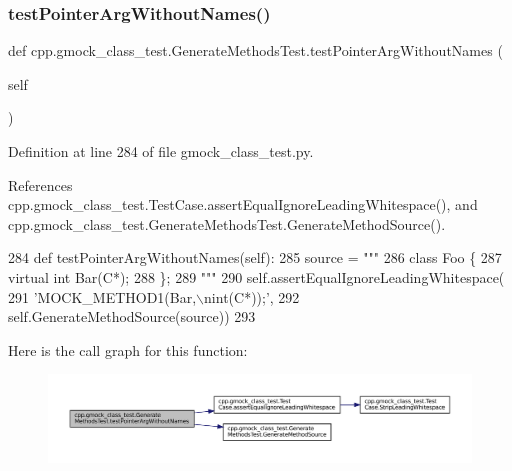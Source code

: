 \subsubsection{\texorpdfstring{test\+Pointer\+Arg\+Without\+Names()}{testPointerArgWithoutNames()}}
{\footnotesize\ttfamily def cpp.\+gmock\+\_\+class\+\_\+test.\+Generate\+Methods\+Test.\+test\+Pointer\+Arg\+Without\+Names (\begin{DoxyParamCaption}\item[{}]{self }\end{DoxyParamCaption})}



Definition at line 284 of file gmock\+\_\+class\+\_\+test.\+py.



References cpp.\+gmock\+\_\+class\+\_\+test.\+Test\+Case.\+assert\+Equal\+Ignore\+Leading\+Whitespace(), and cpp.\+gmock\+\_\+class\+\_\+test.\+Generate\+Methods\+Test.\+Generate\+Method\+Source().


\begin{DoxyCode}
284   \textcolor{keyword}{def }testPointerArgWithoutNames(self):
285     source = \textcolor{stringliteral}{"""}
286 \textcolor{stringliteral}{class Foo \{}
287 \textcolor{stringliteral}{  virtual int Bar(C*);}
288 \textcolor{stringliteral}{\};}
289 \textcolor{stringliteral}{"""}
290     self.assertEqualIgnoreLeadingWhitespace(
291         \textcolor{stringliteral}{'MOCK\_METHOD1(Bar,\(\backslash\)nint(C*));'},
292         self.GenerateMethodSource(source))
293 
\end{DoxyCode}
Here is the call graph for this function\+:
\nopagebreak
\begin{figure}[H]
\begin{center}
\leavevmode
\includegraphics[width=350pt]{classcpp_1_1gmock__class__test_1_1GenerateMethodsTest_a6a2118fde4c59d2f8f402652e7aa8896_cgraph}
\end{center}
\end{figure}
\mbox{\label{classcpp_1_1gmock__class__test_1_1GenerateMethodsTest_af82b50cc3f5daee5f6650fff1323e30c}} 
